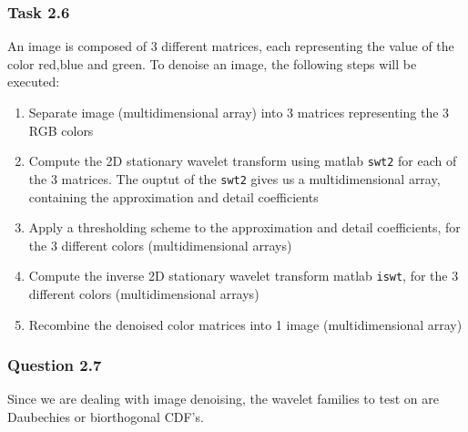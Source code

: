 \documentclass[a4paper]{article}
\begin{document}
    \subsubsection{Task 2.6} \label{subsubsec:RedDen}

	An image is composed of 3 different matrices, each representing the value of the color red,blue and green. To denoise an image, the following steps will be executed:
\begin{enumerate}
	\item Separate image (multidimensional array) into 3 matrices representing the 3 RGB colors
	\item Compute the 2D stationary wavelet transform using matlab \texttt{swt2} for each of the 3 matrices. The ouptut of the \texttt{swt2} gives us a multidimensional array, containing the approximation and detail coefficients
	\item Apply a thresholding scheme to the approximation and detail coefficients, for the 3 different colors (multidimensional arrays)
	\item Compute the inverse 2D stationary wavelet transform matlab \texttt{iswt}, for the 3 different colors (multidimensional arrays)
	\item Recombine the denoised color matrices into 1 image (multidimensional array)
\end{enumerate}

    \subsubsection{Question 2.7}
	Since we are dealing with image denoising, the wavelet families to test on are Daubechies or biorthogonal CDF's. \\
\end{document}
